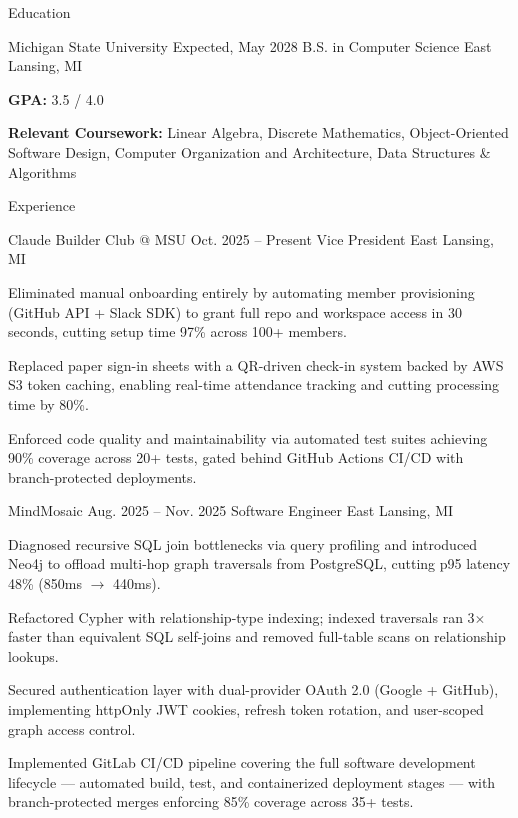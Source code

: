 \documentclass[
	11pt
]{../../../resume}
\begin{document}
	\begin{rSection}{E}{ducation}
		\begin{rSectionEntry}
			{Michigan State University}
			{Expected, May 2028}
			{B.S. in Computer Science}
			{}
			{East Lansing, MI}

			\item \textbf{GPA:} 3.5 / 4.0
			\item \textbf{Relevant Coursework:} Linear Algebra, Discrete Mathematics, Object-Oriented Software Design, Computer Organization and Architecture, Data Structures \& Algorithms
		\end{rSectionEntry}
	\end{rSection}

	\begin{rSection}{E}{xperience}
		\begin{rSectionEntry}
			{Claude Builder Club @ MSU}
			{Oct. 2025 -- Present}
			{Vice President}
			{}
			{East Lansing, MI}

			\item Eliminated manual onboarding entirely by automating member provisioning (GitHub API + Slack SDK) to grant full repo and workspace access in 30 seconds, cutting setup time 97\% across 100+ members.
			\item Replaced paper sign-in sheets with a QR-driven check-in system backed by AWS S3 token caching, enabling real-time attendance tracking and cutting processing time by 80\%.
			\item Enforced code quality and maintainability via automated test suites achieving 90\% coverage across 20+ tests, gated behind GitHub Actions CI/CD with branch-protected deployments.
		\end{rSectionEntry}

		\begin{rSectionEntry}
			{MindMosaic}
			{Aug. 2025 -- Nov. 2025}
			{Software Engineer}
			{}
			{East Lansing, MI}

			\item Diagnosed recursive SQL join bottlenecks via query profiling and introduced Neo4j to offload multi-hop graph traversals from PostgreSQL, cutting p95 latency 48\% (850ms $\rightarrow$ 440ms).
			\item Refactored Cypher with relationship-type indexing; indexed traversals ran 3$\times$ faster than equivalent SQL self-joins and removed full-table scans on relationship lookups.
			\item Secured authentication layer with dual-provider OAuth 2.0 (Google + GitHub), implementing httpOnly JWT cookies, refresh token rotation, and user-scoped graph access control.
			\item Implemented GitLab CI/CD pipeline covering the full software development lifecycle — automated build, test, and containerized deployment stages — with branch-protected merges enforcing 85\% coverage across 35+ tests.
		\end{rSectionEntry}
	\end{rSection}
\end{document}
